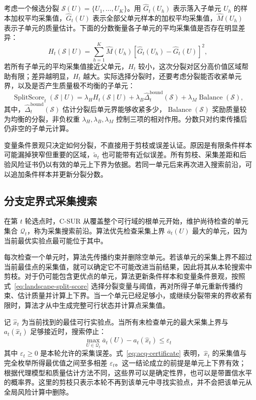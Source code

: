 \documentclass[UTF8,11pt,a4paper,fontset=none]{ctexart}
\newcommand{\1}{\mathbf 1}
\begin{document}
考虑一个候选分裂 $\mathcal S(U)=\{U_1,\ldots,U_K\}$。用 $\widehat G_t(U_h)$ 表示落入子单元 $U_h$ 的样本加权平均采集值，$\widehat G_t(U)$ 表示全部父单元样本的加权平均采集值，$\widehat M(U_h)$ 表示子单元的质量估计。下面的分数衡量各子单元的平均采集值是否存在明显差异：
\begin{equation}
  H_t(\mathcal S\mid U)
  =
  \sum_{h=1}^{K}
  \widehat M(U_h)
  \left[
    \widehat G_t(U_h)-\widehat G_t(U)
  \right]^2,
  \label{eq:landscape-heterogeneity}
\end{equation}
若所有子单元的平均采集值接近父单元，$H_t$ 较小，这次分裂对区分高价值区域帮助有限；差异越明显，$H_t$ 越大。实际选择分裂时，还要考虑分裂能否收紧单元界，以及是否产生质量极不均衡的子单元：
\begin{equation}
  \operatorname{SplitScore}_t(\mathcal S\mid U)
  =\lambda_H H_t(\mathcal S\mid U)
  +\lambda_B\widehat\Delta_t^{\mathrm{bound}}(\mathcal S)
  +\lambda_M\operatorname{Balance}(\mathcal S),
  \label{eq:landscape-split-score}
\end{equation}
其中，$\widehat\Delta_t^{\mathrm{bound}}(\mathcal S)$ 估计分裂后单元界能够收紧多少，$\operatorname{Balance}(\mathcal S)$ 奖励质量较为均衡的分裂，非负权重 $\lambda_H,\lambda_B,\lambda_M$ 控制三项的相对作用。分数只对约束传播后仍非空的子单元计算。

变量条件景观只决定如何分裂，不直接用于剪枝或误差认证。原因是有限条件样本可能漏掉狭窄但重要的区域，$\widetilde a_t$ 也可能带有近似误差。所有剪枝、采集差距和后验风险证书仍以有效的单元上下界为依据。若同一单元后来再次进入搜索前沿，可以追加条件样本并更新分裂分数。

\subsection{分支定界式采集搜索}

在第 $t$ 轮选点时，C-SUR 从覆盖整个可行域的根单元开始，维护尚待检查的单元集合 $\mathcal Q_t$，称为采集搜索前沿。算法优先检查采集上界 $\overline a_t(U)$ 最大的单元，因为当前最优实验点最可能位于其中。

每次检查一个单元时，算法先传播约束并删除空单元。若该单元的采集上界不超过当前最佳点的采集值，就可以确定它不可能改进当前结果，因此将其从本轮搜索中剪枝。对于仍可能包含更优点的单元，算法更新条件样本和变量条件景观，按照式~\eqref{eq:landscape-split-score} 选择分裂变量与阈值，再对所得子单元重新传播约束、估计质量并计算上下界。当一个单元已经足够小，或继续分裂带来的界收紧有限时，算法才从中生成完整可行状态并计算点采集值。

记 $\widehat x_t$ 为当前找到的最佳可行实验点。当所有未检查单元的最大采集上界与 $a_t(\widehat x_t)$ 足够接近时，搜索停止：
\begin{equation}
  \max_{U\in\mathcal Q_t}\overline a_t(U)
  -a_t(\widehat x_t)\leq\varepsilon_t
  \label{eq:acq-certificate}
\end{equation}
其中 $\varepsilon_t\geq0$ 是本轮允许的采集误差。式~\eqref{eq:acq-certificate} 表明，$\widehat x_t$ 的采集值与完全枚举所得最优值之间至多相差 $\varepsilon_t$。这一结论成立的前提是单元上下界有效；根据代理模型和质量估计方法不同，这些界可以是确定性界，也可以是带置信水平的概率界。这里的剪枝只表示本轮不再到该单元中寻找实验点，并不会把该单元从全局风险计算中删除。
\end{document}
